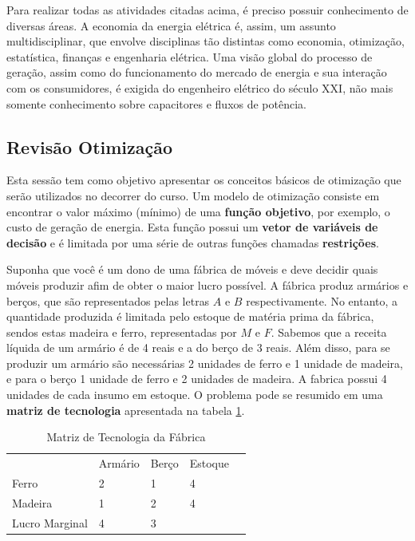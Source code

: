 Para realizar todas as atividades citadas acima, é preciso possuir
conhecimento de diversas áreas. A economia da energia elétrica é,
assim, um assunto multidisciplinar, que envolve disciplinas tão distintas
como economia, otimização, estatística, finanças e engenharia elétrica.
Uma visão global do processo de geração, assim como do funcionamento
do mercado de energia e sua interação com os consumidores, é exigida
do engenheiro elétrico do século XXI, não mais somente conhecimento
sobre capacitores e fluxos de potência. 




\subsection{Revisão Otimização}
Esta sessão tem como objetivo apresentar os conceitos básicos de otimização que serão utilizados no decorrer do curso. Um modelo de otimização consiste em encontrar o valor máximo (mínimo) de uma \textbf{função objetivo}, por exemplo, o custo de geração de energia. Esta função possui um \textbf{vetor de variáveis de decisão} e é limitada por uma série de outras funções chamadas \textbf{restrições}.

Suponha que você é um dono de uma fábrica de móveis e deve decidir quais móveis produzir afim de obter o maior lucro possível. A fábrica produz armários e berços, que são representados pelas letras $A$ e $B$ respectivamente. No entanto, a quantidade produzida é limitada pelo estoque de matéria prima da fábrica, sendos estas madeira e ferro, representadas por $M$ e $F$. Sabemos que a receita líquida de um armário é de 4 reais e a do berço de 3 reais. Além disso, para se produzir um armário são necessárias 2 unidades de ferro e 1 unidade de madeira, e para o berço 1 unidade de ferro e 2 unidades de madeira. A fabrica possui 4 unidades de cada insumo em estoque. O problema pode se resumido em uma \textbf{matriz de tecnologia} apresentada na tabela \ref{tabela1}.

\begin{table}[H]
\begin{center}

\begin{tabular}{l|l|l|ll}
               & Armário & Berço & Estoque &  \\ \cline{1-4}
Ferro          & 2       & 1     & 4       &  \\ \cline{1-4}
Madeira        & 1       & 2     & 4       &  \\ \cline{1-4}
Lucro Marginal & 4       & 3     &         & 
\end{tabular}
\caption{Matriz de Tecnologia da Fábrica}
\label{tabela1}
\end{center}
\end{table}

